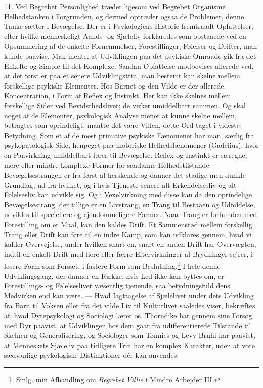 \documentclass[12pt]{article}
\newcommand{\opage}[1]{\marginnote{\footnotesize\textit{[#1]}}}
\begin{document}
\opage{34}11. Ved Begrebet Personlighed træder ligesom ved Begrebet
Organisme Helhedstanken i Forgrunden, og dermed optræder ogsaa de
Problemer, denne Tanke sætter i Bevægelse. Der er i Psykologiens
Historie fremtraadt Opfattelser, efter hvilke menneskeligt Aands- og
Sjæleliv forklaredes som opstaaede ved en Opsummering af de enkelte
Fornemmelser, Forestillinger, Følelser og Drifter, man kunde paavise.
Man mente, at Udviklingen paa det psykiske Omraade gik fra det Enkelte
og Simple til det Komplexe. Saadan Opfattelse modbevises allerede ved,
at det først er paa et senere Udviklingstrin, man bestemt kan skelne
mellem forskellige psykiske Elementer. Hos Barnet og den Vilde er der
allerede Koncentration, i Form af Reflex og Instinkt. Her kan ikke
skelnes mellem forskellige Sider ved Bevidsthedslivet; de virker
umiddelbart sammen. Og skal noget af de Elementer, psykologisk Analyse
mener at kunne skelne mellem, betragtes som oprindeligt, maatte det
være Villen, dette Ord taget i videste Betydning. Som et af de mest
primitive psykiske Fænomener har man, særlig fra psykopatologisk Side,
henpeget paa \guillemotright{}motoriske Helhedsfænomener\guillemotleft{} (Gadelius), hvor en
Paavirkning umiddelbart fører til Bevægelse. Reflex og Instinkt er
særegne, mere eller mindre komplexe Former for saadanne
Helhedstilstande. Bevægelsestrangen er fra først af herskende og danner
det stadige men dunkle Grundlag, ud fra hvilket, og i hvis
\setcounter{footnote}{0}%
\opage{35}Tjeneste senere alt Erkendelsesliv og alt Følelsesliv kan
udvikle sig. Og i Vexelvirkning med disse kan da den oprindelige
Bevægelsestrang, der tillige er en Livstrang, en Trang til Bestaaen og
Udfoldelse, udvikles til speciellere og ejendommeligere Former. Naar
Trang er forbunden med Forestilling om et Maal, kan den kaldes Drift.
Et Sammenstød mellem forskellig Trang eller Drift kan føre til en indre
Kamp, som kan udklares gennem, hvad vi kalder Overvejelse, under
hvilken snart en, snart en anden Drift har Overvægten, indtil en enkelt
Drift med flere eller færre Eftervirkninger af Brydninger sejrer, i
løsere Form som Forsæt, i fastere Form som
Beslutning.\footnote{Smlg. min Afhandling om \textit{Begrebet Villie} i
\guillemotright{}Mindre Arbejder\guillemotleft{} III.} I hele denne Udviklingsgang, der danner en
Række, hvis Led ikke kan byttes om, er Forestillings- og
Følelseslivet væsentlig tjenende, saa betydningsfuld dens Medvirken end
kan være. --- Hvad Iagttagelse af Sjælelivet under dets Udvikling fra
Barn til Voksen eller fra det \guillemotright{}vilde\guillemotleft{} Liv til Kulturlivet saaledes
viser, bekræftes af, hvad Dyrepsykologi og Sociologi lærer os.
Thorndike har gennem sine Forsøg med Dyr paavist, at Udviklingen hos
dem gaar fra udifferentierede Tilstande til Skelnen og Generalisering,
og Sociologer som Tønnies og Levy Bruhl har paavist, at Menneskets
Sjæleliv paa tidligere Trin har en komplex Karakter, uden at vore
sædvanlige psykologiske Distinktioner dér kan anvendes.
\end{document}
